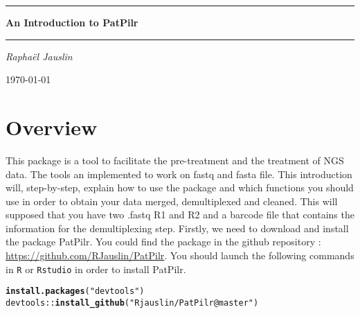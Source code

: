 \documentclass{article}\usepackage[]{graphicx}\usepackage[]{color}
\makeatletter
\newcommand{\hlstr}[1]{\textcolor[rgb]{0.192,0.494,0.8}{#1}}%
\newcommand{\hlopt}[1]{\textcolor[rgb]{0,0,0}{#1}}%
\newcommand{\hlstd}[1]{\textcolor[rgb]{0.345,0.345,0.345}{#1}}%
\newcommand{\hlkwd}[1]{\textcolor[rgb]{0.737,0.353,0.396}{\textbf{#1}}}%
\newenvironment{kframe}{%
 \def\at@end@of@kframe{}%
 \ifinner\ifhmode%
  \def\at@end@of@kframe{\end{minipage}}%
  \begin{minipage}{\columnwidth}%
 \fi\fi%
 \def\FrameCommand##1{\hskip\@totalleftmargin \hskip-\fboxsep
 \colorbox{shadecolor}{##1}\hskip-\fboxsep
     \hskip-\linewidth \hskip-\@totalleftmargin \hskip\columnwidth}%
 \MakeFramed {\advance\hsize-\width
   \@totalleftmargin\z@ \linewidth\hsize
   \@setminipage}}%
 {\par\unskip\endMakeFramed%
 \at@end@of@kframe}
\newenvironment{knitrout}{}{} %
\makeatother
\begin{document}

 \begin{titlepage}
 \hrule
 \vspace{0.5cm}
 {\huge\centering \bfseries An Introduction to PatPilr  \par}
 \vspace{0.5cm}
 \hrule
 \vspace{1.5cm}
 {\huge\bfseries \par}
 \vspace{2cm}
 {\Large\itshape Rapha\"el Jauslin\par}
 \vfill
 \vfill
 {\large \today\par}
 \end{titlepage}


\newpage

\tableofcontents
\newpage

\section{Overview}

This package is a tool to facilitate the pre-treatment and the treatment of NGS data. The tools an implemented to work on fastq and fasta file. This introduction will, step-by-step, explain how to use the package and which functions you should use in order to obtain your data merged, demultiplexed and cleaned. This will supposed that you have two .fastq R1 and R2 and a barcode file that contains the information for the demultiplexing step. Firstly, we need to download and install the package PatPilr. You could find the package in the github repository : \url{https://github.com/RJauslin/PatPilr}. You should launch the following commands in \texttt{R} or \texttt{Rstudio} in order to install PatPilr.

\begin{knitrout}
\color{fgcolor}\begin{kframe}
\begin{alltt}
\hlkwd{install.packages}\hlstd{(}\hlstr{"devtools"}\hlstd{)}
\hlstd{devtools}\hlopt{::}\hlkwd{install_github}\hlstd{(}\hlstr{"Rjauslin/PatPilr@master"}\hlstd{)}
\end{alltt}
\end{kframe}
\end{knitrout}
\end{document}
